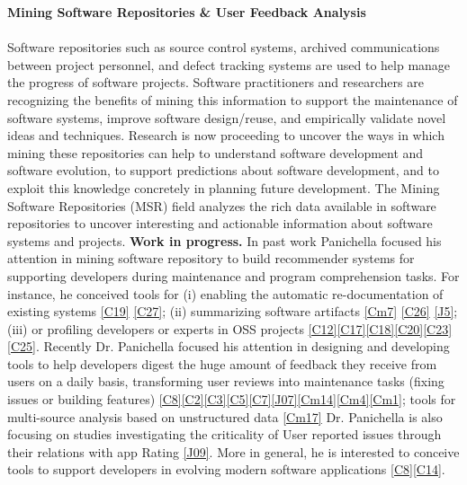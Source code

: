 \documentclass[10pt]{article}
\newcommand{\blankline}{\quad\pagebreak[3]}
\begin{document}
\textbf{Mining Software Repositories \& User Feedback Analysis}
\blankline \\\\
Software repositories such as source control systems, archived communications between project personnel, and defect tracking systems are used to help manage the progress of software projects. Software practitioners and researchers are recognizing the benefits of mining this information to support the maintenance of software systems, improve software design/reuse, and empirically validate novel ideas and techniques. Research is now proceeding to uncover the ways in which mining these repositories can help to understand software development and software evolution, to support predictions about software development, and to exploit this knowledge concretely in planning future development. The Mining Software Repositories (MSR) field analyzes the rich data available in software repositories to uncover interesting and actionable information about software systems and projects.
   \textbf{Work in progress.}  In past work Panichella focused his attention in mining software repository to build recommender systems for supporting developers during maintenance and program comprehension tasks. For instance, he conceived tools for  (i) enabling the automatic re-documentation of existing systems \ref{C19} \ref{C27};  (ii) summarizing software artifacts \ref{Cm7} \ref{C26} \ref{J5};  (iii) or profiling developers or experts in OSS projects \ref{C12}\ref{C17}\ref{C18}\ref{C20}\ref{C23}\ref{C25}. 
   Recently Dr. Panichella  focused his attention in designing and developing tools to help  developers digest the huge amount of feedback they receive from users on a daily basis, transforming user reviews into maintenance tasks (fixing issues or building features) \ref{C8}\ref{C2}\ref{C3}\ref{C5}\ref{C7}\ref{J07}\ref{Cm14}\ref{Cm4}\ref{Cm1}; tools  for multi-source analysis based on unstructured data \ref{Cm17}
  Dr. Panichella is also focusing on studies investigating the criticality of User reported issues through their relations with app Rating \ref{J09}.      
   More in general, he is interested to conceive tools to support developers in evolving modern software applications \ref{C8}\ref{C14}. \\
   
\end{document}
